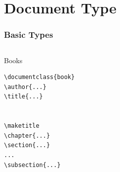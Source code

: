 
\section{Document Type}

\begin{frame}
\frametitle{Basic Types}
\begin{columns}
\begin{column}{.35\textwidth}
\begin{beamerboxesrounded}[width=\linewidth]{Books}
\begin{lstlisting}[moretexcs={chapter,subsection,maketitle}, basicstyle={\ttfamily}, emph={book}]
\documentclass{book}
\author{...}
\title{...}


\maketitle
\chapter{...}
\section{...}
...
\subsection{...}


\end{lstlisting}
\end{beamerboxesrounded}
\end{column}
\end{columns}
\end{frame}

